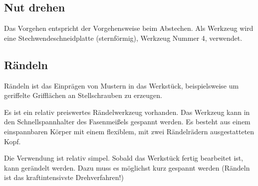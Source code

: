\documentclass{\basedir/fablab-document}
\begin{document}
\subsection{Nut drehen}

Das Vorgehen entspricht der Vorgehensweise beim Abstechen.
Als Werkzeug wird eine Stechwendeschneidplatte (sternförmig), Werkzeug Nummer 4, verwendet.


\subsection{Rändeln}
\label{handdrehen:raendeln}

Rändeln ist das Einprägen von Mustern in das Werkstück, beispielsweise um geriffelte Grifflächen an Stellschrauben zu erzeugen.

Es ist ein relativ preiswertes Rändelwerkzeug vorhanden.
Das Werkzeug kann in den Schnellspannhalter des Fasenmeißels gespannt werden.
Es besteht aus einem einspannbaren Körper mit einem flexiblem, mit zwei Rändelrädern ausgestatteten Kopf.

Die Verwendung ist relativ simpel.
Sobald das Werkstück fertig bearbeitet ist, kann gerändelt werden.
Dazu muss es möglichst kurz gespannt werden (Rändeln ist das kraftintensivste Drehverfahren!)
\end{document}
